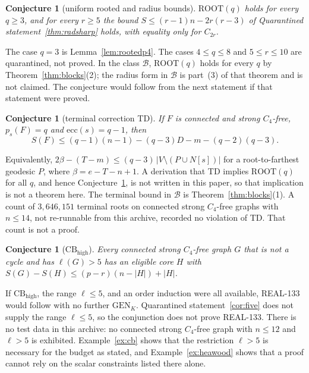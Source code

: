 \documentclass[11pt]{amsart}
\newtheorem{conjecture}[theorem]{Conjecture}
\theoremstyle{definition}
\theoremstyle{remark}
\newcommand{\lr}{\ell}
\newcommand{\pp}{p}
\newcommand{\GEN}{\mathrm{GEN}}
\newcommand{\ROOT}{\mathrm{ROOT}}
\begin{document}
\begin{conjecture}[uniform rooted and radius bounds]\label{conj:uniform}
$\ROOT(q)$ holds for every $q\ge3$, and for every $r\ge5$ the bound $S\le(r-1)n-2r(r-3)$ of Quarantined statement~\ref{thm:radsharp} holds, with equality only for $C_{2r}$.
\end{conjecture}

The case $q=3$ is Lemma~\ref{lem:rootedp4}. The cases $4\le q\le 8$ and $5\le r\le 10$ are quarantined, not proved. In the class $\mathcal B$, $\ROOT(q)$ holds for every $q$ by Theorem~\ref{thm:blocks}(2); the radius form in $\mathcal B$ is part~(3) of that theorem and is not claimed. The conjecture would follow from the next statement if that statement were proved.

\begin{conjecture}[terminal correction TD]\label{conj:td}
If $F$ is connected and strong $C_4$-free, $\pp_s(F)=q$ and $\mathrm{ecc}(s)=q-1$, then
\[
S(F)\le(q-1)(n-1)-(q-3)D-m-(q-2)(q-3).
\]
\end{conjecture}

Equivalently, $2\beta-(T-m)\le(q-3)\,|V\setminus(P\cup N[s])|$ for a root-to-farthest geodesic $P$, where $\beta=e-T-n+1$. A derivation that TD implies $\ROOT(q)$ for all $q$, and hence Conjecture~\ref{conj:uniform}, is not written in this paper, so that implication is not a theorem here. The terminal bound in $\mathcal B$ is Theorem~\ref{thm:blocks}(1). A count of $3{,}646{,}151$ terminal roots on connected strong $C_4$-free graphs with $n\le 14$, not re-runnable from this archive, recorded no violation of TD. That count is not a proof.

\begin{conjecture}[$\mathrm{CB}_{\mathrm{high}}$]\label{conj:cbhigh}
Every connected strong $C_4$-free graph $G$ that is not a cycle and has $\lr(G)>5$ has an eligible core $H$ with $S(G)-S(H)\le(\pp-r)(n-|H|)+|H|$.
\end{conjecture}

If $\mathrm{CB}_{\mathrm{high}}$, the range $\lr\le 5$, and an order induction were all available, REAL-133 would follow with no further $\GEN_K$. Quarantined statement~\ref{cor:five} does not supply the range $\lr\le 5$, so the conjunction does not prove REAL-133. There is no test data in this archive: no connected strong $C_4$-free graph with $n\le 12$ and $\lr>5$ is exhibited. Example~\ref{ex:cb} shows that the restriction $\lr>5$ is necessary for the budget as stated, and Example~\ref{ex:heawood} shows that a proof cannot rely on the scalar constraints listed there alone.
\end{document}
